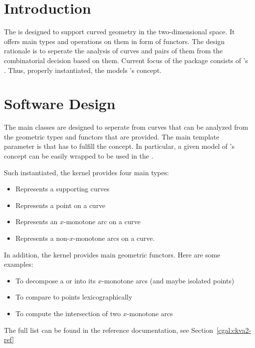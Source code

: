 \section{Introduction}

The  is designed to support 
curved geometry in the two-dimensional space. It offers main types
and operations on them in form of functors. The design rationale is
to seperate the analysis of curves and pairs of them from the
combinatorial decision based on them. Current focus of the package
consists of \cgal's . Thus, 
properly instantiated, the 
models \cgal's  concept.

\section{Software Design}

The main classes are designed to seperate from curves that can be analyzed
from the geometric types and functors that are provided. The main
template parameter is  that has to fulfill the 
 concept. In particular, a given model of
\cgal's  concept can be easily
wrapped to be used in the .

Such instantiated, the kernel provides four main types:
\begin{itemize}
\item {} Represents a supporting curves
\item {} Represents a point on a curve
\item {} Represents an $x$-monotone arc on a curve
\item {} Represents a non-$x$-monotone arcs on a 
curve.
\end{itemize}

In addition, the kernel provides main geometric functors. Here are some
examples:
\begin{itemize}
\item {} To decompose a  or 
 into its $x$-monotone arcs (and maybe isolated
points)
\item {} To compare to points lexicographically
\item {} To compute the intersection of 
two $x$-monotone arcs
\end{itemize}
The full list can be found in the reference documentation, see 
Section~\ref{cgal:ckva2-ref}

